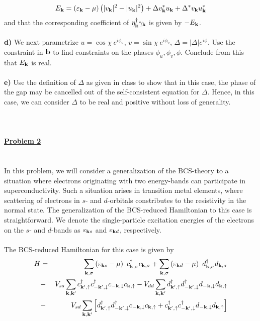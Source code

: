 \documentclass{article}
\begin{document}
\begin{eqnarray}
E_{\bf k} = \left( \varepsilon_{\bf k} - \mu \right) \left( |v_{\bf k}|^2-|u_{\bf k}|^2 \right) 
+ \Delta v^{*}_{\bf k} u_{\bf k} + \Delta^{*} v_{\bf k} u^{*}_{\bf k} \nonumber
\end{eqnarray}
and that the corresponding coefficient  of $\eta^{\dagger}_{ \bf k }  \gamma_{ \bf k }$ is given by  $- E_{\bf k} $.  
\ \\
\ \\
{\bf d)} We next parametrize $u = \cos \chi ~e^{i \phi_u}$, $v =  \sin \chi ~e^{i \phi_v} $, $\Delta = |\Delta| e^{i \phi}$. Use the constraint in ${\bf b}$ to find constraints on the phases $\phi_u,\phi_v,\phi$. Conclude from this that $E_{\bf k}$ is real. 
\ \\
\ \\
{\bf e)} Use the definition of $\Delta$ as given in class to show that in this case, the phase of the gap may be cancelled out of the self-consistent equation for $\Delta$. Hence, in this case, we can consider $\Delta$ to be real and positive without loss of generality.   
\ \\
\ \\
\ \\
\ \\
\underline{\large\bf Problem 2 }\\
\ \\
\ \\
In this problem, we will consider a generalization of the BCS-theory to a situation where electrons originating with two energy-bands can participate in superconductivity. Such a situation arises in transition metal elements, where scattering of electrons in $s$- and $d$-orbitals constributes to the resistivity in the normal state. The generalization of the BCS-reduced Hamiltonian to this case is  straightforward. We denote the single-particle excitation energies of the electrons on the $s$- and $d$-bands as $\varepsilon_{{\bf k} s}$ and $\varepsilon_{{\bf k} d}$, respectively.
\ \\
\ \\
The BCS-reduced Hamiltonian for this case is given by
\begin{eqnarray}
H&  = &  \sum_{{\bf k},\sigma} \left( \varepsilon_{{\bf k} s} - \mu \right) ~ c^{\dagger}_{{\bf k},\sigma} c_{{\bf k},\sigma}
+  \sum_{{\bf k},\sigma} \left( \varepsilon_{{\bf k} d} - \mu \right)  ~ d^{\dagger}_{{\bf k},\sigma} d_{{\bf k},\sigma} \nonumber \\
& - & V_{ss} \sum_{{\bf k},{\bf k}^{\prime}} c^{\dagger}_{{\bf k}^{\prime},\uparrow}c^{\dagger}_{-{\bf k}^{\prime},\downarrow}
c_{-{\bf k},\downarrow}c_{{\bf k},\uparrow}
- V_{dd} \sum_{{\bf k},{\bf k}^{\prime}} d^{\dagger}_{{\bf k}^{\prime},\uparrow}d^{\dagger}_{-{\bf k}^{\prime},\downarrow}
d_{-{\bf k},\downarrow} d_{{\bf k},\uparrow} \nonumber \\
& - & V_{sd} \sum_{{\bf k},{\bf k}^{\prime}} \left[  d^{\dagger}_{{\bf k}^{\prime},\uparrow}d^{\dagger}_{-{\bf k}^{\prime},\downarrow}
c_{-{\bf k},\downarrow} c_{{\bf k},\uparrow} 
+c^{\dagger}_{{\bf k}^{\prime},\uparrow}c^{\dagger}_{-{\bf k}^{\prime},\downarrow}
d_{-{\bf k},\downarrow} d_{{\bf k},\uparrow} \nonumber
\right]
\end{eqnarray}
\end{document}
